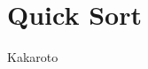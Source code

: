 \documentclass[knowledge.tex]{subfiles}
\begin{document}
    \section{Quick Sort}
    Kakaroto
\end{document}
